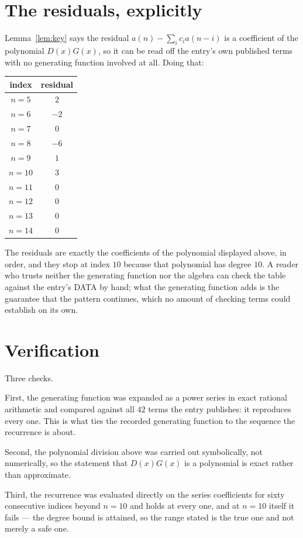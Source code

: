 \documentclass[11pt,a4paper]{article}
\theoremstyle{plain}
\theoremstyle{definition}
\begin{document}
\section{The residuals, explicitly}

Lemma~\ref{lem:key} says the residual $a(n)-\sum_ic_ia(n-i)$ is a coefficient of the
polynomial $D(x)G(x)$, so it can be read off the entry's own published terms with no
generating function involved at all. Doing that:
\begin{center}
\begin{tabular}{cc}
index & residual \\ \hline
$n=5$ & $2$ \\
$n=6$ & $-2$ \\
$n=7$ & $0$ \\
$n=8$ & $-6$ \\
$n=9$ & $1$ \\
$n=10$ & $3$ \\
$n=11$ & $0$ \\
$n=12$ & $0$ \\
$n=13$ & $0$ \\
$n=14$ & $0$
\end{tabular}
\end{center}
The residuals are exactly the coefficients of the polynomial displayed above, in order, and
they stop at index $10$ because that polynomial has degree $10$. A reader who trusts
neither the generating function nor the algebra can check the table against the entry's DATA
by hand; what the generating function adds is the guarantee that the pattern continues, which
no amount of checking terms could establish on its own.

\section{Verification}

Three checks.

First, the generating function was expanded as a power series in exact rational arithmetic and
compared against all $42$ terms the entry publishes: it reproduces every one. This is
what ties the recorded generating function to the sequence the recurrence is about.

Second, the polynomial division above was carried out symbolically, not numerically, so the
statement that $D(x)G(x)$ is a polynomial is exact rather than approximate.

Third, the recurrence was evaluated directly on the series coefficients for sixty consecutive
indices beyond $n=10$ and holds at every one, and at $n=10$ itself it fails --- the
degree bound is attained, so the range stated is the true one and not merely a safe one.
\end{document}
